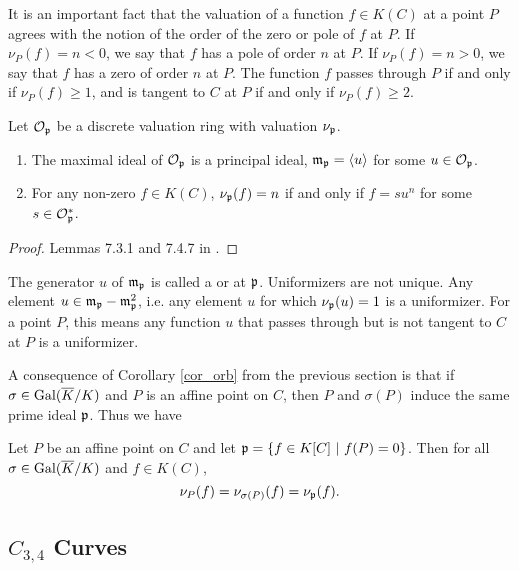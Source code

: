 It is an important fact that the valuation of a function $f \in K(C)$ at a point $P$
agrees with the notion of the order of the zero or pole of $f$ at $P$.
If $\nu_P(f) = n < 0$, we say that $f$ has a pole of order $n$ at $P$.
If $\nu_P(f) = n > 0$, we say that $f$ has a zero of order $n$ at $P$.
The function $f$ passes through $P$ if and only if $\nu_P(f) \geq 1$,
and is tangent to $C$ at $P$ if and only if $\nu_P(f) \geq 2$.
\begin{proposition}
  Let $\cal O_{\frak p}$ be a discrete valuation ring with valuation $\nu_{\frak p}$.
  \begin{enumerate}[label=(\roman*)]
    \item
      The maximal ideal of $\cal O_{\frak p}$ is a principal ideal,
      $\frak m_{\frak p} = \pid u$ for some $u \in \cal O_{\frak p}$.
    \item
      For any non-zero $f \in K(C)$,
      $\nu_{\frak p}(f) = n$ if and only if $f = su^n$ for some $s \in \cal O_{\frak p}^*$.
  \end{enumerate}
\end{proposition}
\begin{proof}
  Lemmas 7.3.1 and 7.4.7 in \cite{galbraith12}.
\end{proof}
The generator $u$ of $\frak m_{\frak p}$ is called a  or  at $\frak p$.
Uniformizers are not unique.
Any element $u \in \frak m_{\frak p} - \frak m_{\frak p}^2$,
i.e. any element $u$ for which $\nu_{\frak p}(u) = 1$ is a uniformizer.
For a point $P$, this means any function $u$ that passes through but is not tangent to $C$ at $P$ is a uniformizer.

A consequence of Corollary \ref{cor_orb} from the previous section
is that if $\sigma \in \Gal(\bar K/K)$ and $P$ is an affine point on $C$,
then $P$ and $\sigma(P)$ induce the same prime ideal $\frak p$. Thus we have
\begin{proposition}
  \label{prop_valuation_on_orbit}
  Let $P$ be an affine point on $C$ and let $\frak p = \{ f \in K[C] ~|~ f(P) = 0 \}$.
  Then for all $\sigma \in \Gal(\bar K/K)$ and $f \in K(C)$,
  \[ \nu_P(f) = \nu_{\sigma(P)}(f) = \nu_{\frak p}(f). \]
\end{proposition}




\subsection{$C_{3,4}$ Curves}
\label{sec_c34_curves}


